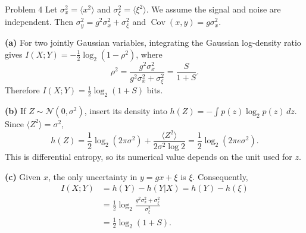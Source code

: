 \documentclass[12pt,a4paper]{article}
\begin{document}
\begin{solution}{Problem 4}
Let $\sigma_x^2=\langle x^2\rangle$ and
$\sigma_\xi^2=\langle\xi^2\rangle$. We assume the signal and noise are
independent. Then $\sigma_y^2=g^2\sigma_x^2+\sigma_\xi^2$ and
$\operatorname{Cov}(x,y)=g\sigma_x^2$.

\textbf{(a)} For two jointly Gaussian variables, integrating the Gaussian
log-density ratio gives
$I(X;Y)=-\tfrac12\log_2(1-\rho^2)$, where
\[
 \rho^2=\frac{g^2\sigma_x^2}{g^2\sigma_x^2+\sigma_\xi^2}
        =\frac{S}{1+S}.
\]
Therefore $\boxed{I(X;Y)=\tfrac12\log_2(1+S)}$ bits.

\textbf{(b)} If $Z\sim\mathcal N(0,\sigma^2)$, insert its density into
$h(Z)=-\int p(z)\log_2p(z)\,dz$. Since $\langle Z^2\rangle=\sigma^2$,
\[
 h(Z)=\frac12\log_2(2\pi\sigma^2)
      +\frac{\langle Z^2\rangle}{2\sigma^2\log 2}
      =\boxed{\frac12\log_2(2\pi e\sigma^2)}.
\]
This is differential entropy, so its numerical value depends on the unit
used for $z$.

\textbf{(c)} Given $x$, the only uncertainty in $y=gx+\xi$ is $\xi$.
Consequently,
\begin{align*}
 I(X;Y)&=h(Y)-h(Y|X)=h(Y)-h(\xi)\\
 &=\frac12\log_2\frac{g^2\sigma_x^2+\sigma_\xi^2}{\sigma_\xi^2}\\
 &=\boxed{\frac12\log_2(1+S)}.
\end{align*}
\end{solution}
\end{document}
